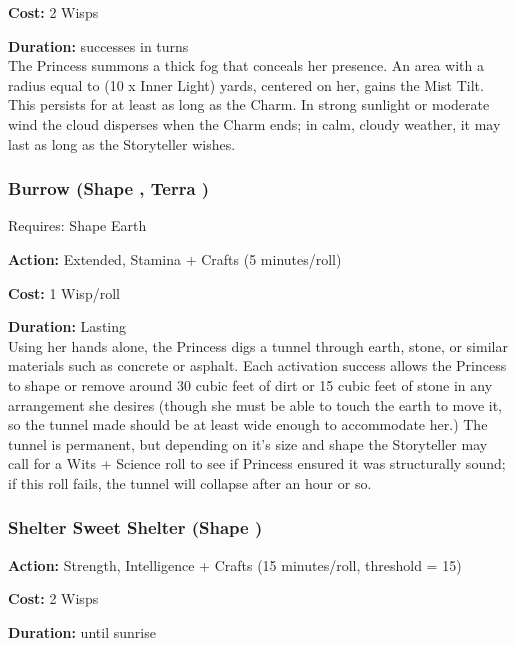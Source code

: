 \noindent \textbf{Cost:} 2 Wisps

\noindent \textbf{Duration:} successes in turns \\

\noindent The Princess summons a thick fog that conceals her presence. An area with a radius equal to (10 x Inner Light) yards, centered on her, gains the Mist Tilt. This persists for at least as long as the Charm. In strong sunlight or moderate wind the cloud disperses when the Charm ends; in calm, cloudy weather, it may last as long as the Storyteller wishes.




\subsubsection*{Burrow (Shape \textbullet\textbullet\textbullet, Terra \textbullet\textbullet)}

\noindent Requires: Shape Earth

\noindent \textbf{Action:} Extended, Stamina + Crafts (5 minutes/roll)

\noindent \textbf{Cost:} 1 Wisp/roll

\noindent \textbf{Duration:} Lasting \\

\noindent Using her hands alone, the Princess digs a tunnel through earth, stone, or similar materials such as concrete or asphalt. Each activation success allows the Princess to shape or remove around 30 cubic feet of dirt or 15 cubic feet of stone in any arrangement she desires (though she must be able to touch the earth to move it, so the tunnel made should be at least wide enough to accommodate her.) The tunnel is permanent, but depending on it's size and shape the Storyteller may call for a Wits + Science roll to see if Princess ensured it was structurally sound; if this roll fails, the tunnel will collapse after an hour or so.

\subsubsection*{Shelter Sweet Shelter (Shape \textbullet\textbullet\textbullet\textbullet)}
\noindent \textbf{Action:} Strength, Intelligence + Crafts (15 minutes/roll, threshold = 15)

\noindent \textbf{Cost:} 2 Wisps

\noindent \textbf{Duration:} until sunrise\\


